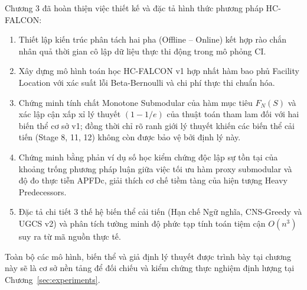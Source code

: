 Chương 3 đã hoàn thiện việc thiết kế và đặc tả hình thức phương pháp HC-FALCON:
\begin{enumerate}
    \item Thiết lập kiến trúc phân tách hai pha (Offline -- Online) kết hợp rào chắn nhân quả thời gian cô lập dữ liệu thực thi động trong mô phỏng CI.
    \item Xây dựng mô hình toán học HC-FALCON v1 hợp nhất hàm bao phủ Facility Location với xác suất lỗi Beta-Bernoulli và chi phí thực thi chuẩn hóa.
    \item Chứng minh tính chất Monotone Submodular của hàm mục tiêu $F_N(S)$ và xác lập cận xấp xỉ lý thuyết $(1 - 1/e)$ của thuật toán tham lam đối với hai biến thể cơ sở v1; đồng thời chỉ rõ ranh giới lý thuyết khiến các biến thể cải tiến (Stage 8, 11, 12) không còn được bảo vệ bởi định lý này.
    \item Chứng minh bằng phản ví dụ số học kiểm chứng độc lập sự tồn tại của khoảng trống phương pháp luận giữa việc tối ưu hàm proxy submodular và độ đo thực tiễn APFDc, giải thích cơ chế tiềm tàng của hiện tượng Heavy Predecessors.
    \item Đặc tả chi tiết 3 thế hệ biến thể cải tiến (Hạn chế Ngữ nghĩa, CNS-Greedy và UGCS v2) và phân tích tường minh độ phức tạp tính toán tiệm cận $O(n^3)$ suy ra từ mã nguồn thực tế.
\end{enumerate}

Toàn bộ các mô hình, biến thể và giả định lý thuyết được trình bày tại chương này sẽ là cơ sở nền tảng để đối chiếu và kiểm chứng thực nghiệm định lượng tại Chương~\ref{sec:experiments}.
